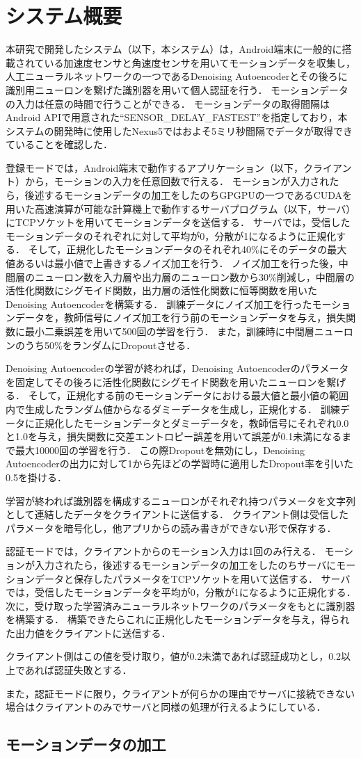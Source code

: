 \section{システム概要}
本研究で開発したシステム（以下，本システム）は，Android端末に一般的に搭載されている加速度センサと角速度センサを用いてモーションデータを収集し，人工ニューラルネットワークの一つであるDenoising Autoencoderとその後ろに識別用ニューロンを繋げた識別器を用いて個人認証を行う．
モーションデータの入力は任意の時間で行うことができる．
モーションデータの取得間隔はAndroid APIで用意された``SENSOR_DELAY_FASTEST''を指定しており，本システムの開発時に使用したNexus5ではおよそ5ミリ秒間隔でデータが取得できていることを確認した．

登録モードでは，Android端末で動作するアプリケーション（以下，クライアント）から，モーションの入力を任意回数で行える．
モーションが入力されたら，後述するモーションデータの加工をしたのちGPGPUの一つであるCUDAを用いた高速演算が可能な計算機上で動作するサーバプログラム（以下，サーバ）にTCPソケットを用いてモーションデータを送信する．
サーバでは，受信したモーションデータのそれぞれに対して平均が0，分散が1になるように正規化する．
そして，正規化したモーションデータのそれぞれ40\%にそのデータの最大値あるいは最小値で上書きするノイズ加工を行う．
ノイズ加工を行った後，中間層のニューロン数を入力層や出力層のニューロン数から30\%削減し，中間層の活性化関数にシグモイド関数，出力層の活性化関数に恒等関数を用いたDenoising Autoencoderを構築する．
訓練データにノイズ加工を行ったモーションデータを，教師信号にノイズ加工を行う前のモーションデータを与え，損失関数に最小二乗誤差を用いて500回の学習を行う．
また，訓練時に中間層ニューロンのうち50\%をランダムにDropoutさせる．

Denoising Autoencoderの学習が終われば，Denoising Autoencoderのパラメータを固定してその後ろに活性化関数にシグモイド関数を用いたニューロンを繋げる．
そして，正規化する前のモーションデータにおける最大値と最小値の範囲内で生成したランダム値からなるダミーデータを生成し，正規化する．
訓練データに正規化したモーションデータとダミーデータを，教師信号にそれぞれ0.0と1.0を与え，損失関数に交差エントロピー誤差を用いて誤差が0.1未満になるまで最大10000回の学習を行う．
この際Dropoutを無効にし，Denoising Autoencoderの出力に対して1から先ほどの学習時に適用したDropout率を引いた0.5を掛ける．

学習が終われば識別器を構成するニューロンがそれぞれ持つパラメータを文字列として連結したデータをクライアントに送信する．
クライアント側は受信したパラメータを暗号化し，他アプリからの読み書きができない形で保存する．

認証モードでは，クライアントからのモーション入力は1回のみ行える．
モーションが入力されたら，後述するモーションデータの加工をしたのちサーバにモーションデータと保存したパラメータをTCPソケットを用いて送信する．
サーバでは，受信したモーションデータを平均が0，分散が1になるように正規化する．
次に，受け取った学習済みニューラルネットワークのパラメータをもとに識別器を構築する．
構築できたらこれに正規化したモーションデータを与え，得られた出力値をクライアントに送信する．

クライアント側はこの値を受け取り，値が0.2未満であれば認証成功とし，0.2以上であれば認証失敗とする．

また，認証モードに限り，クライアントが何らかの理由でサーバに接続できない場合はクライアントのみでサーバと同様の処理が行えるようにしている．

\subsection{モーションデータの加工}

